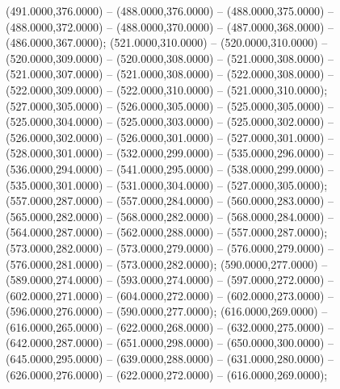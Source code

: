 \begin{scope}[draw=black,fill=cffffbf,line join=round,line width=0.208pt]
    (491.0000,376.0000) -- (488.0000,376.0000) -- (488.0000,375.0000) --
    (488.0000,372.0000) -- (488.0000,370.0000) -- (487.0000,368.0000) --
    (486.0000,367.0000);
   (521.0000,310.0000) -- (520.0000,310.0000) --
    (520.0000,309.0000) -- (520.0000,308.0000) -- (521.0000,308.0000) --
    (521.0000,307.0000) -- (521.0000,308.0000) -- (522.0000,308.0000) --
    (522.0000,309.0000) -- (522.0000,310.0000) -- (521.0000,310.0000);
   (527.0000,305.0000) -- (526.0000,305.0000) --
    (525.0000,305.0000) -- (525.0000,304.0000) -- (525.0000,303.0000) --
    (525.0000,302.0000) -- (526.0000,302.0000) -- (526.0000,301.0000) --
    (527.0000,301.0000) -- (528.0000,301.0000) -- (532.0000,299.0000) --
    (535.0000,296.0000) -- (536.0000,294.0000) -- (541.0000,295.0000) --
    (538.0000,299.0000) -- (535.0000,301.0000) -- (531.0000,304.0000) --
    (527.0000,305.0000);
   (557.0000,287.0000) -- (557.0000,284.0000) --
    (560.0000,283.0000) -- (565.0000,282.0000) -- (568.0000,282.0000) --
    (568.0000,284.0000) -- (564.0000,287.0000) -- (562.0000,288.0000) --
    (557.0000,287.0000);
   (573.0000,282.0000) -- (573.0000,279.0000) --
    (576.0000,279.0000) -- (576.0000,281.0000) -- (573.0000,282.0000);
   (590.0000,277.0000) -- (589.0000,274.0000) --
    (593.0000,274.0000) -- (597.0000,272.0000) -- (602.0000,271.0000) --
    (604.0000,272.0000) -- (602.0000,273.0000) -- (596.0000,276.0000) --
    (590.0000,277.0000);
   (616.0000,269.0000) -- (616.0000,265.0000) --
    (622.0000,268.0000) -- (632.0000,275.0000) -- (642.0000,287.0000) --
    (651.0000,298.0000) -- (650.0000,300.0000) -- (645.0000,295.0000) --
    (639.0000,288.0000) -- (631.0000,280.0000) -- (626.0000,276.0000) --
    (622.0000,272.0000) -- (616.0000,269.0000);
\end{scope}
